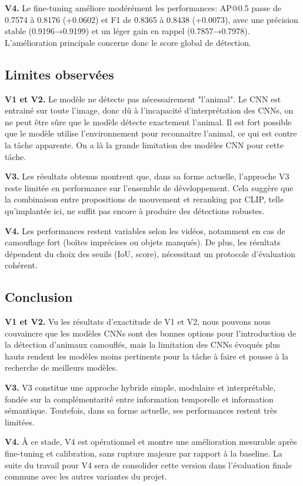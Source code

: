 \documentclass{article}
\begin{document}
\textbf{V4.}
Le fine-tuning améliore modérément les performances: AP@0.5 passe de 0.7574 à 0.8176 (+0.0602) et F1 de 0.8365 à 0.8438 (+0.0073), avec une précision stable (0.9196→0.9199) et un léger gain en rappel (0.7857→0.7978). L’amélioration principale concerne donc le score global de détection.

\subsection{Limites observées}
\textbf{V1 et V2.}
Le modèle ne détecte pas nécessairement "l'animal". Le CNN est entrainé sur toute l'image, donc dû à l'incapacité d'interprétation des CNNs, on ne peut être sûre que le modèle détecte exactement l'animal. Il est fort possible que le modèle utilise l'environnement pour reconnaitre l'animal, ce qui est contre la tâche apparente.  On a là la grande limitation des modèles CNN pour cette tâche.

\textbf{V3.}
Les résultats obtenus montrent que, dans sa forme actuelle, l’approche V3 reste limitée en performance sur l’ensemble de développement. Cela suggère que la combinaison entre propositions de mouvement et reranking par CLIP, telle qu’implantée ici, ne suffit pas encore à produire des détections robustes.

\textbf{V4.}
Les performances restent variables selon les vidéos, notamment en cas de camouflage fort (boîtes imprécises ou objets manqués). De plus, les résultats dépendent du choix des seuils (IoU, score), nécessitant un protocole d’évaluation cohérent.

\subsection{Conclusion}
\textbf{V1 et V2.}
Vu les résultats d'exactitude de V1 et V2, nous pouvons nous couvaincre que les modèles CNNs sont des bonnes options pour l'introduction de la détection d'animaux camouflés, mais la limitation des CNNs évoqués plus hauts rendent les modèles moins pertinents pour la tâche à faire et pousse à la recherche de meilleurs modèles.

\textbf{V3.}
V3 constitue une approche hybride simple, modulaire et interprétable, fondée sur la complémentarité entre information temporelle et information sémantique. Toutefois, dans sa forme actuelle, ses performances restent très limitées.

\textbf{V4.}
À ce stade, V4 est opérationnel et montre une amélioration mesurable après fine-tuning et calibration, sans rupture majeure par rapport à la baseline. La suite du travail pour V4 sera de consolider cette version dans l’évaluation finale commune avec les autres variantes du projet.
\end{document}
